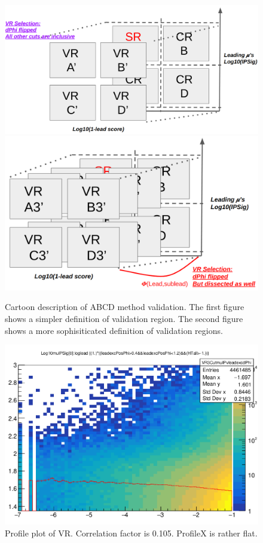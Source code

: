 \begin{figure}[h!]
  \caption{Cartoon description of ABCD method validation. The first figure shows a simpler definition of validation region. The second figure shows a more sophisiticated definition of validation regions. }
  \label{fig:valcar}
  \centering
  \includegraphics[width=0.85\linewidth]{figs/SimpleVR.png}
  \includegraphics[width=0.85\linewidth]{figs/SophiVR.png}

\end{figure}

\begin{figure}[h!]
  \caption{Profile plot of VR. Correlation factor is 0.105. ProfileX is rather flat.}
  \label{fig:valcar}
  \centering
  \includegraphics[width=0.65\linewidth]{figs/VR3.png}

\end{figure}


